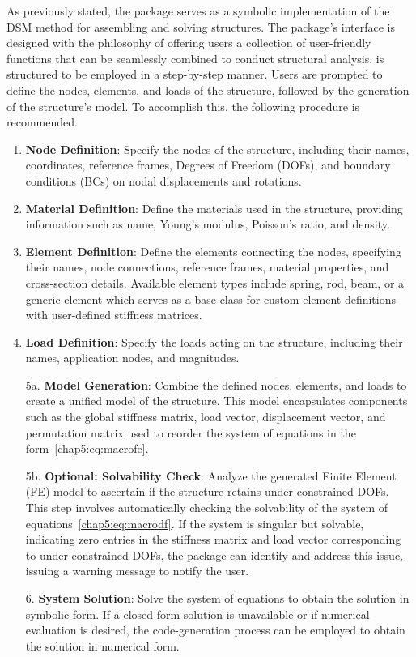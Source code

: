 As previously stated, the \TrussMe{} package serves as a symbolic implementation of the \ac{DSM} method for assembling and solving structures. The package's interface is designed with the philosophy of offering users a collection of user-friendly functions that can be seamlessly combined to conduct structural analysis. \TrussMe{} is structured to be employed in a step-by-step manner. Users are prompted to define the nodes, elements, and loads of the structure, followed by the generation of the structure's model. To accomplish this, the following procedure is recommended.
%
\begin{enumerate}
  \setlength{\itemsep}{0.0em}
  \item \textbf{Node Definition}: Specify the nodes of the structure, including their names, coordinates, reference frames, Degrees of Freedom (\acp{DOF}), and boundary conditions (\acp{BC}) on nodal displacements and rotations.
  \item \textbf{Material Definition}: Define the materials used in the structure, providing information such as name, Young's modulus, Poisson's ratio, and density.
  \item \textbf{Element Definition}: Define the elements connecting the nodes, specifying their names, node connections, reference frames, material properties, and cross-section details. Available element types include spring, rod, beam, or a generic element which serves as a base class for custom element definitions with user-defined stiffness matrices.
  \item \textbf{Load Definition}: Specify the loads acting on the structure, including their names, application nodes, and magnitudes.
  \item[5a.] \textbf{Model Generation}: Combine the defined nodes, elements, and loads to create a unified model of the structure. This model encapsulates components such as the global stiffness matrix, load vector, displacement vector, and permutation matrix used to reorder the system of equations in the form~\eqref{chap5:eq:macrofe}.
  \item[5b.] \textbf{Optional: Solvability Check}: Analyze the generated Finite Element (FE) model to ascertain if the structure retains under-constrained \acp{DOF}. This step involves automatically checking the solvability of the system of equations~\eqref{chap5:eq:macrodf}. If the system is singular but solvable, indicating zero entries in the stiffness matrix and load vector corresponding to under-constrained \acp{DOF}, the \TrussMe{} package can identify and address this issue, issuing a warning message to notify the user.
  \item[6.] \textbf{System Solution}: Solve the system of equations to obtain the solution in symbolic form. If a closed-form solution is unavailable or if numerical evaluation is desired, the code-generation process can be employed to obtain the solution in numerical form.
\end{enumerate}


